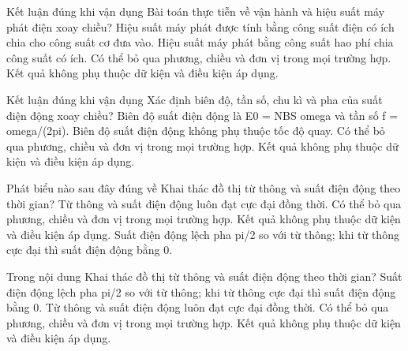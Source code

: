 \begin{ex}
Kết luận đúng khi vận dụng Bài toán thực tiễn về vận hành và hiệu suất máy phát điện xoay chiều?
\choice
{\True Hiệu suất máy phát được tính bằng công suất điện có ích chia cho công suất cơ đưa vào.}
{Hiệu suất máy phát bằng công suất hao phí chia công suất có ích.}
{Có thể bỏ qua phương, chiều và đơn vị trong mọi trường hợp.}
{Kết quả không phụ thuộc dữ kiện và điều kiện áp dụng.}
\end{ex}

\begin{ex}
Kết luận đúng khi vận dụng Xác định biên độ, tần số, chu kì và pha của suất điện động xoay chiều?
\choice
{\True Biên độ suất điện động là E0 = NBS omega và tần số f = omega/(2pi).}
{Biên độ suất điện động không phụ thuộc tốc độ quay.}
{Có thể bỏ qua phương, chiều và đơn vị trong mọi trường hợp.}
{Kết quả không phụ thuộc dữ kiện và điều kiện áp dụng.}
\end{ex}

\begin{ex}
Phát biểu nào sau đây đúng về Khai thác đồ thị từ thông và suất điện động theo thời gian?
\choice
{Từ thông và suất điện động luôn đạt cực đại đồng thời.}
{Có thể bỏ qua phương, chiều và đơn vị trong mọi trường hợp.}
{Kết quả không phụ thuộc dữ kiện và điều kiện áp dụng.}
{\True Suất điện động lệch pha pi/2 so với từ thông; khi từ thông cực đại thì suất điện động bằng 0.}
\end{ex}

\begin{ex}
Trong nội dung Khai thác đồ thị từ thông và suất điện động theo thời gian?
\choice
{\True Suất điện động lệch pha pi/2 so với từ thông; khi từ thông cực đại thì suất điện động bằng 0.}
{Từ thông và suất điện động luôn đạt cực đại đồng thời.}
{Có thể bỏ qua phương, chiều và đơn vị trong mọi trường hợp.}
{Kết quả không phụ thuộc dữ kiện và điều kiện áp dụng.}
\end{ex}


